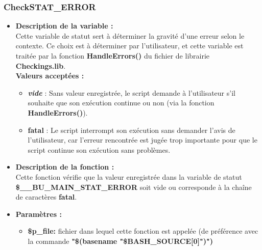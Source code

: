 \documentclass[a4paper,10pt]{article}
\begin{document}
\subsubsection{CheckSTAT\_ERROR}\color{white}

\begin{itemize}
    \item \textbf{Description de la variable :}\\
    Cette variable de statut sert à déterminer la gravité d'une erreur selon le contexte. Ce choix est à déterminer par l'utilisateur, et cette variable est traitée par la fonction \textbf{\color{mauve}HandleErrors()} du fichier de librairie \textbf{\color{lime}Checkings.lib}.\\[1\baselineskip]

    \textbf{Valeurs acceptées :}
    \begin{itemize}
        \item \textbf{\textit{vide}} : Sans valeur enregistrée, le script demande à l'utilisateur s'il souhaite que son exécution
        continue ou non (via la fonction \textbf{\color{mauve}HandleErrors()}).\\[1\baselineskip]

        \item \textbf{fatal} : Le script interrompt son exécution sans demander l'avis de l'utilisateur, car l'erreur rencontrée est jugée trop importante pour que le script continue son exécution sans problèmes.\\[1\baselineskip]
    \end{itemize}

    \item \textbf{Description de la fonction :}\\
        Cette fonction vérifie que la valeur enregistrée dans la variable de statut \textbf{\color{orange}\$\_\_BU\_MAIN\_STAT\_ERROR} soit vide ou corresponde à la chaîne de caractères \textbf{fatal}.\\[1\baselineskip]

    \item \textbf{Paramètres :}
    \begin{itemize}
        \item \textbf{\color{orange}\$p\_file\color{white}:} fichier dans lequel cette fonction est appelée (de préférence avec la commande \textbf{\textbf{"\$(\color{gray}basename \color{white}"\color{orange}\$BASH\_SOURCE[0]\color{white}")")}}\\[1\baselineskip]


\end{itemize}
\end{itemize}
\end{document}

